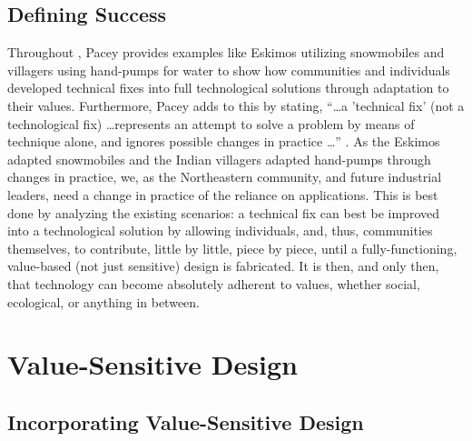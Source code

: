 \documentclass[conference]{IEEEtran}
\begin{document}
\subsection{Defining Success}

Throughout \cite{b1}, Pacey provides examples like Eskimos utilizing snowmobiles and villagers using hand-pumps for water to show how communities and individuals developed technical fixes into full technological solutions through adaptation to their values. Furthermore, Pacey adds to this by stating, ``\dots a 'technical fix' (not a technological fix) \dots represents an attempt to solve a problem by means of technique alone, and ignores possible changes in practice \dots'' \cite[pp. 7]{b1}. As the Eskimos adapted snowmobiles and the Indian villagers adapted hand-pumps through changes in practice, we, as the Northeastern community, and future industrial leaders, need a change in practice of the reliance on applications. This is best done by analyzing the existing scenarios: a technical fix can best be improved into a technological solution by allowing individuals, and, thus, communities themselves, to contribute, little by little, piece by piece, until a fully-functioning, value-based (not just sensitive) design is fabricated. It is then, and only then, that technology can become absolutely adherent to values, whether social, ecological, or anything in between.

\section{Value-Sensitive Design}

\subsection{Incorporating Value-Sensitive Design}
\end{document}
